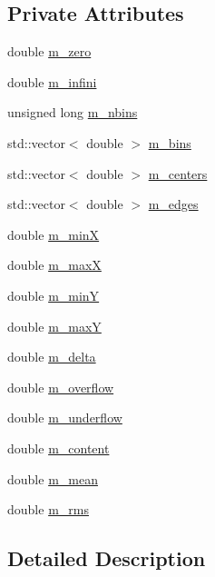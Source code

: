 \subsection*{Private Attributes}
\begin{DoxyCompactItemize}
\item 
double \hyperlink{classHisto1D_ac87bd1971cc300ce6fc1e745785cacb9}{m\_\-zero}
\item 
double \hyperlink{classHisto1D_a47c1ba33be0574ca167f43a1b27ba1a0}{m\_\-infini}
\item 
unsigned long \hyperlink{classHisto1D_a1913aca9a278b4bfd365f35b85e65d8d}{m\_\-nbins}
\item 
std::vector$<$ double $>$ \hyperlink{classHisto1D_a7a82923d3938739904469f5aa0a517ca}{m\_\-bins}
\item 
std::vector$<$ double $>$ \hyperlink{classHisto1D_a0e03676ed176aaad2f615fa84b8ffcd3}{m\_\-centers}
\item 
std::vector$<$ double $>$ \hyperlink{classHisto1D_a4188c6d1b4bfc8f9d8bde7616b4dbf5b}{m\_\-edges}
\item 
double \hyperlink{classHisto1D_af5ce58b20e96fa6e4b306109dd88589e}{m\_\-minX}
\item 
double \hyperlink{classHisto1D_a6a5007569e096537f9b7b39d2aad865b}{m\_\-maxX}
\item 
double \hyperlink{classHisto1D_a3bb6c3ea23a1af14ebb10af807f3810d}{m\_\-minY}
\item 
double \hyperlink{classHisto1D_a28a8995424e36088c47643f8c1a7fa7f}{m\_\-maxY}
\item 
double \hyperlink{classHisto1D_a993e2e40b89e257e6f86c0742f6f06b3}{m\_\-delta}
\item 
double \hyperlink{classHisto1D_ab60b2ec4e435a3094b7ec218404aa16f}{m\_\-overflow}
\item 
double \hyperlink{classHisto1D_a7f475b822f4bbb23209e2e523d228380}{m\_\-underflow}
\item 
double \hyperlink{classHisto1D_a75f4abeae577e232f4c012cb6b4049d7}{m\_\-content}
\item 
double \hyperlink{classHisto1D_a7e49893543fb5d2af37167690bc0b0ff}{m\_\-mean}
\item 
double \hyperlink{classHisto1D_a1331c670df40eb18d8a814f5a15ec7da}{m\_\-rms}
\end{DoxyCompactItemize}


\subsection{Detailed Description}



